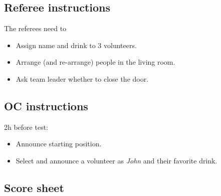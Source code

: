 \subsection*{Referee instructions}

The referees need to
\begin{itemize}
	\item Assign name and drink to 3 volunteers.
	\item Arrange (and re-arrange) people in the living room.
	\item Ask team leader whether to close the door.
\end{itemize}

\subsection*{OC instructions}

2h before test:
\begin{itemize}
	\item Announce starting position.
	\item Select and announce a volunteer as \emph{John} and their favorite drink.
\end{itemize}

\subsection*{Score sheet}

